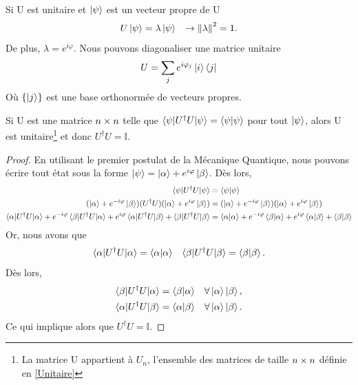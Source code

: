 \documentclass[../notesdecours.tex]{subfiles}
\begin{document}
\begin{Property} Si U est unitaire et $\ket{\psi}$ est un vecteur propre de U
\begin{align}
U\ket{\psi} &= \lambda\ket{\psi}		&\rightarrow \norm{\lambda}^2 = 1.
\end{align}
De plus, $\lambda = e^{i\varphi}$. Nous pouvons diagonaliser une matrice unitaire 
\begin{equation}
U = \sum_j e^{i\varphi_j}\ket{i}\bra{j}
\end{equation}
Où $\{\ket{j}\}$ est une base orthonormée de vecteurs propres. \end{Property}

\begin{theorem}
Si U est une matrice $n\times n$ telle que $\braket{\psi|U^\dag U|\psi} = \braket{\psi|\psi}$ pour tout $\ket{\psi}$, alors U est unitaire\footnote{La matrice U appartient à $U_n$, l'ensemble des matrices de taille $n\times n$ définie en \ref{Unitaire}} et donc $U^\dag U = \mathbb{I}$.
\end{theorem}
\begin{proof}
En utilisant le premier postulat de la Mécanique Quantique, nous pouvons écrire tout état sous la forme $\ket{\psi} = \ket{\alpha} + e^{i\varphi}\ket{\beta}$. Dès lors,
\begin{align*}
\braket{\psi|U^\dag U|\psi} &= \braket{\psi|\psi}\\
(\ket{\alpha} + e^{-i\varphi}\ket{\beta})(U^\dag U)(\ket{\alpha} + e^{i\varphi}\ket{\beta}) &= (\ket{\alpha} + e^{-i\varphi}\ket{\beta})(\ket{\alpha} + e^{i\varphi}\ket{\beta})\\
\braket{\alpha|U^\dag U|\alpha} + e^{-i\varphi}\braket{\beta|U^\dag U|\alpha} + e^{i\varphi}\braket{\alpha|U^\dag U|\beta} + \braket{\beta|U^\dag U|\beta} &= \braket{\alpha|\alpha} + e^{-i\varphi}\braket{\beta|\alpha} + e^{i\varphi}\braket{\alpha|\beta} + \braket{\beta|\beta}
\end{align*}
Or, nous avons que
\begin{align*}
\braket{\alpha|U^\dag U|\alpha} &= \braket{\alpha|\alpha}		&\braket{\beta|U^\dag U|\beta} = \braket{\beta|\beta}.
\end{align*}
Dès lors, 
\begin{align*}
\braket{\beta|U^\dag U |\alpha} &= \braket{\beta|\alpha}	&\forall\ket{\alpha}\ket{\beta},\\
\braket{\alpha|U^\dag U|\beta} &= \braket{\alpha|\beta}	&\forall\ket{\alpha}\ket{\beta}.
\end{align*}
Ce qui implique alors que $U^\dag U = \mathbb{I}$.
\end{proof}
\end{document}

